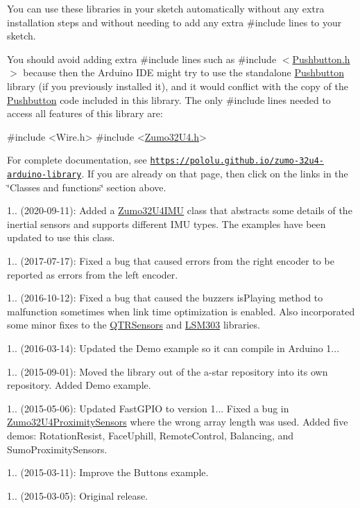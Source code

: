 You can use these libraries in your sketch automatically without any extra installation steps and without needing to add any extra {\ttfamily \#include} lines to your sketch.

You should avoid adding extra {\ttfamily \#include} lines such as {\ttfamily \#include $<$\hyperlink{_pushbutton_8h}{Pushbutton.\+h}$>$} because then the Arduino I\+DE might try to use the standalone \hyperlink{class_pushbutton}{Pushbutton} library (if you previously installed it), and it would conflict with the copy of the \hyperlink{class_pushbutton}{Pushbutton} code included in this library. The only {\ttfamily \#include} lines needed to access all features of this library are\+:


\begin{DoxyCode}
\textcolor{preprocessor}{#include <Wire.h>}
\textcolor{preprocessor}{#include <\hyperlink{_zumo32_u4_8h}{Zumo32U4.h}>}
\end{DoxyCode}


For complete documentation, see \href{https://pololu.github.io/zumo-32u4-arduino-library}{\tt https\+://pololu.\+github.\+io/zumo-\/32u4-\/arduino-\/library}. If you are already on that page, then click on the links in the \char`\"{}\+Classes and functions\char`\"{} section above.


\begin{DoxyItemize}
\item 1.. (2020-\/09-\/11)\+: Added a \hyperlink{class_zumo32_u4_i_m_u}{Zumo32\+U4\+I\+MU} class that abstracts some details of the inertial sensors and supports different I\+MU types. The examples have been updated to use this class.
\item 1.. (2017-\/07-\/17)\+: Fixed a bug that caused errors from the right encoder to be reported as errors from the left encoder.
\item 1.. (2016-\/10-\/12)\+: Fixed a bug that caused the buzzer\textquotesingle{}s {\ttfamily is\+Playing} method to malfunction sometimes when link time optimization is enabled. Also incorporated some minor fixes to the \hyperlink{class_q_t_r_sensors}{Q\+T\+R\+Sensors} and \hyperlink{class_l_s_m303}{L\+S\+M303} libraries.
\item 1.. (2016-\/03-\/14)\+: Updated the Demo example so it can compile in Arduino 1...
\item 1.. (2015-\/09-\/01)\+: Moved the library out of the a-\/star repository into its own repository. Added Demo example.
\item 1.. (2015-\/05-\/06)\+: Updated Fast\+G\+P\+IO to version 1... Fixed a bug in \hyperlink{class_zumo32_u4_proximity_sensors}{Zumo32\+U4\+Proximity\+Sensors} where the wrong array length was used. Added five demos\+: Rotation\+Resist, Face\+Uphill, Remote\+Control, Balancing, and Sumo\+Proximity\+Sensors.
\item 1.. (2015-\/03-\/11)\+: Improve the Buttons example.
\item 1.. (2015-\/03-\/05)\+: Original release. 
\end{DoxyItemize}